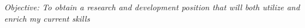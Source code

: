 \documentclass{res}
\begin{document}
 
\thispagestyle{empty} %
\vspace{0.3in}
\address{
{\tt hyogi@vt.edu}, (540) 391-0202 \\
Dept. of Computer Science, Virginia Tech\\
2202 Kraft Drive, Blacksburg, VA 24060\\
}


\begin{resume}
\vspace{0.07in}
{\small \it Objective: To obtain a research and development position 
that will both utilize and enrich my current skills}

 
 
 






 
\end{resume}
\end{document}
